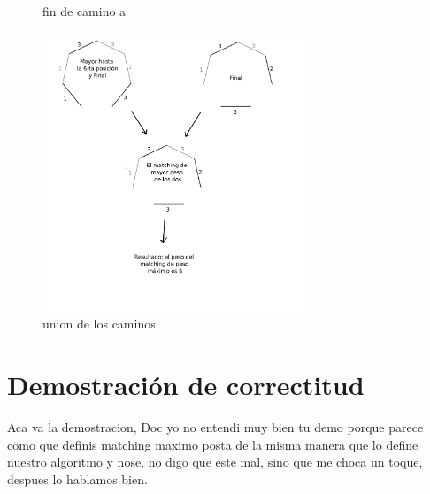 \documentclass[a4paper, 12pt]{article}
\begin{document}
\begin{figure}[H]
\centering
{}
\qquad
{}
\caption{fin de camino a}
\end{figure}

\begin{figure}[H]
\centering
\includegraphics[width=0.7\textwidth]{imagenes/pasosFinales.png} 
\caption{union de los caminos}
\end{figure}

\section*{Demostraci\'on de correctitud}

Aca va la demostracion, Doc yo no entendi muy bien tu demo porque parece como que definis matching maximo posta de la misma manera que lo define nuestro algoritmo y nose, no digo que este mal, sino que me choca un toque, despues lo hablamos bien.
\end{document}
